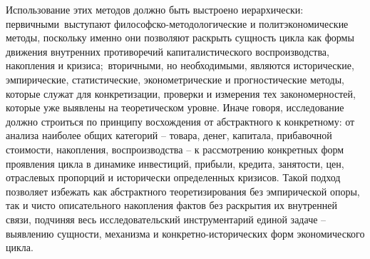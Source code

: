 Использование этих методов должно быть выстроено иерархически: первичными выступают философско-методологические и политэкономические методы, поскольку именно они позволяют раскрыть сущность цикла как формы движения внутренних противоречий капиталистического воспроизводства, накопления и кризиса; вторичными, но необходимыми, являются исторические, эмпирические, статистические, эконометрические и прогностические методы, которые служат для конкретизации, проверки и измерения тех закономерностей, которые уже выявлены на теоретическом уровне. Иначе говоря, исследование должно строиться по принципу восхождения от абстрактного к конкретному: от анализа наиболее общих категорий – товара, денег, капитала, прибавочной стоимости, накопления, воспроизводства – к рассмотрению конкретных форм проявления цикла в динамике инвестиций, прибыли, кредита, занятости, цен, отраслевых пропорций и исторически определенных кризисов. Такой подход позволяет избежать как абстрактного теоретизирования без эмпирической опоры, так и чисто описательного накопления фактов без раскрытия их внутренней связи, подчиняя весь исследовательский инструментарий единой задаче – выявлению сущности, механизма и конкретно-исторических форм экономического цикла.